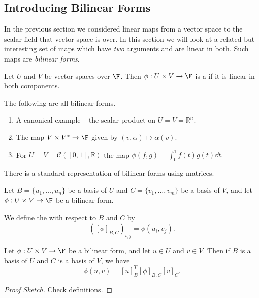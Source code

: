 \documentclass[a4paper]{scrartcl}
\begin{document}
\subsection{Introducing Bilinear Forms}

In the previous section we considered linear maps from a vector space to the scalar field that vector space is over. In this section we will look at a related but interesting set of maps which have \emph{two} arguments and are linear in both.
Such maps are \emph{bilinear forms}.

\begin{definition}
    Let $U$ and $V$ be vector spaces over $\F$. Then $\phi: U \times V \rightarrow \F$ is a  if it is linear in both components.
\end{definition}

\begin{example}
    The following are all bilinear forms.
    \begin{enumerate}[label=(\roman*)]
        \item A canonical example -- the scalar product on $U = V = \mathbb{R}^n$.
        \item The map $V \times V^* \rightarrow \F$ given by $(v, \alpha) \mapsto \alpha(v)$.
        \item For $U = V = \mathcal{C}([0, 1],\mathbb{R})$ the map
        $
        \phi(f, g) = \int_0^1 f(t) g(t) \dd t.
        $
    \end{enumerate}
\end{example}

There is a standard representation of bilinear forms using matrices.

\begin{definition}
    Let $B = \{u_1, \dots, u_n\}$ be a basis of $U$ and $C = \{v_1, \dots, v_m\}$ be a basis of $V$, and let $\phi: U \times V \rightarrow \F$ be a bilinear form.
    
    We define the  with respect to $B$ and $C$ by
    $$
    ([\phi]_{B, C})_{i, j} = \phi(u_i, v_j). 
    $$
\end{definition}

\begin{lemma}
    Let $\phi: U \times V \rightarrow \F$ be a bilinear form, and let $u \in U$ and $v \in V$. Then if $B$ is a basis of $U$ and $C$ is a basis of $V$, we have
    $$
    \phi(u, v) = [u]_B^T [\phi]_{B, C} [v]_C.
    $$
\end{lemma}
\begin{proof}[Proof Sketch]
    Check definitions.
\end{proof}
\end{document}
